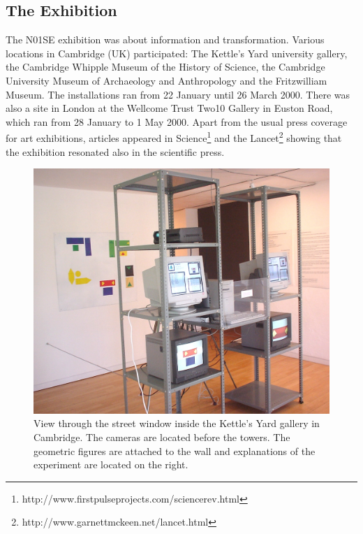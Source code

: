 \subsection{The Exhibition} 
\enlargethispage{2\baselineskip}
The N01SE exhibition was about information and transformation. 
Various locations in Cambridge (UK) participated: The Kettle's Yard university gallery, 
the Cambridge Whipple Museum of the History of Science, the Cambridge University Museum of 
Archaeology and Anthropology and the 
Fritzwilliam Museum. The installations ran from 22 January until 26 March 2000. There was also a site 
in London at the Wellcome Trust Two10 Gallery in Euston Road, which 
ran from 28 January to 1 May 2000. Apart from the usual press coverage for art exhibitions, articles appeared in Science\footnote{http://www.firstpulseprojects.com/sciencerev.html} and the Lancet\footnote{http://www.garnettmckeen.net/lancet.html} showing that the exhibition resonated also in the scientific press. 

\begin{figure}[htbp]
  \centerline{\includegraphics[width=.75\textwidth]{chap9/figs/cambridge-view.jpg}}
\caption{\label{fig:sideview}View through the street window inside the Kettle's Yard gallery in Cambridge. The cameras are located before 
the towers. The geometric figures are attached to the wall and explanations of the experiment are located on the right.}
\end{figure}

